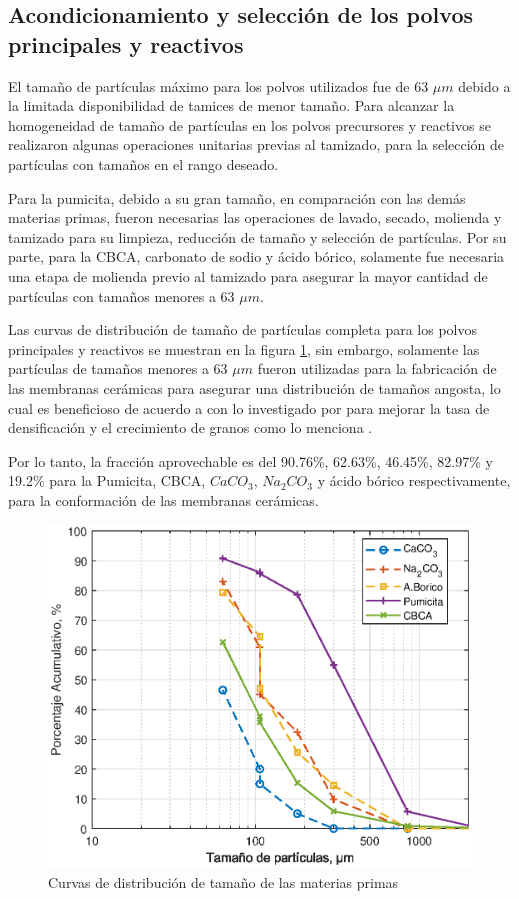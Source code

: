 \documentclass{article}
\begin{document}
\subsection{Acondicionamiento y selección de los polvos principales y reactivos}

El tamaño de partículas máximo para los polvos utilizados fue de 
63 $\mu m$ debido a la limitada disponibilidad de tamices de menor 
tamaño. Para alcanzar la homogeneidad de tamaño de partículas en los 
polvos precursores y reactivos se realizaron algunas operaciones 
unitarias previas al tamizado, para la selección de partículas con 
tamaños en el rango deseado. 

Para la pumicita, debido a su gran tamaño, en comparación con las 
demás materias primas, fueron necesarias las operaciones de lavado, 
secado, molienda y tamizado para su limpieza, reducción de tamaño y 
selección de partículas. Por su parte, para la CBCA, carbonato de 
sodio y ácido bórico, solamente fue necesaria una etapa de molienda 
previo al tamizado para asegurar la mayor cantidad de partículas con 
tamaños menores a 63 $\mu m$. 

Las curvas de distribución de tamaño de partículas completa para los 
polvos principales y reactivos se muestran en la figura \ref{fig:Distribucion_Particulas}, 
sin embargo, solamente las partículas de tamaños menores a 63 $\mu m$ 
fueron utilizadas para la fabricación de las membranas cerámicas para 
asegurar una distribución de tamaños angosta, lo cual es beneficioso de 
acuerdo a con lo investigado por \textcite{Lin1995} para mejorar la tasa 
de densificación y el crecimiento de granos como lo menciona
\textcite{Kang2020}. 

Por lo tanto, la fracción aprovechable es del 
90.76\%, 62.63\%, 46.45\%, 82.97\% y 19.2\% para la Pumicita, 
CBCA, $CaCO_3$, $Na_2CO_3$ y ácido bórico respectivamente, para la 
conformación de las membranas cerámicas. 

\begin{figure}[!htbp]
    \centering
    \includegraphics[width=0.7\linewidth]{Graphics/ParticleDistributionC.eps}
    \caption{Curvas de distribución de tamaño de las materias primas}
    \label{fig:Distribucion_Particulas}
\end{figure}
\end{document}
